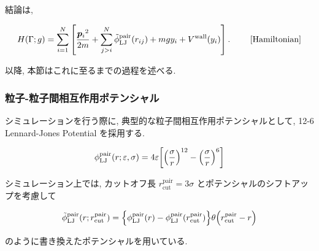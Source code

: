 \documentclass[dvipdfmx]{jsarticle}
\numberwithin{equation}{subsection}
\begin{document}
結論は, 

\begin{align}
  H(\Gamma; g)
  &= \sum_{i=1}^{N}
  \left[
    \frac{{\bm{p}_i}^2}{2m} 
    + \sum_{j > i}^{N}
      \tilde{\phi}_{\text{LJ}}^{\text{pair}}(r_{ij})
    + mgy_i
    + V^{\text{wall}} (y_i)
  \right] . \ \tag*{\eqref{Hamiltonian}} \\
\end{align}

以降, 本節はこれに至るまでの過程を述べる.

\subsubsection{粒子-粒子間相互作用ポテンシャル}

シミュレーションを行う際に, 典型的な粒子間相互作用ポテンシャルとして, 12-6 Lennard-Jones Potential を採用する.

\begin{align}
  \phi_{\text{LJ}}^{\text{pair}}(r; \varepsilon, \sigma) = 4\varepsilon \qty[\qty(\frac{\sigma}{r})^{12} - \qty(\frac{\sigma}{r})^{6} ] \\
\end{align}

シミュレーション上では, カットオフ長 $r_{\text{cut}}^{\text{pair}}=3\sigma$ とポテンシャルのシフトアップを考慮して

\begin{align}
  \tilde{\phi}_{\text{LJ}}^{\text{pair}}(r;r_{\text{cut}}^{\text{pair}}) = \qty{\phi_{\text{LJ}}^{\text{pair}}(r) - \phi_{\text{LJ}}^{\text{pair}}(r_{\text{cut}}^{\text{pair}})}\theta \qty(r_{\text{cut}}^{\text{pair}}-r) \\
\end{align}

のように書き換えたポテンシャルを用いている.

\end{document}
